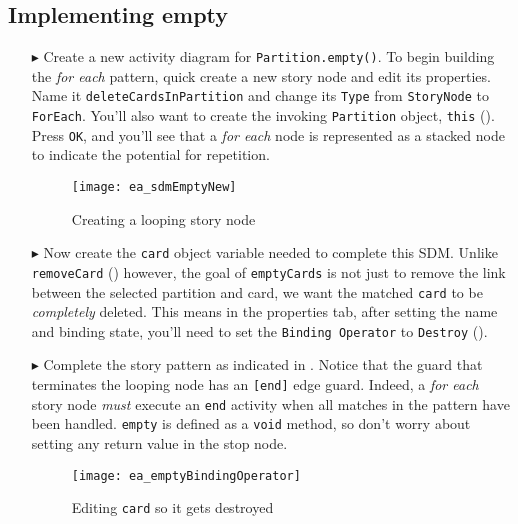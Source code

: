 \newpage
\hypertarget{emptyPartition vis}{}
\subsection{Implementing empty}
\genHeader

\begin{itemize}

\item[$\blacktriangleright$] Create a new activity diagram for \texttt{Partition.empty()}. To begin building the \emph{for each} pattern, quick create a new
story node and edit its properties. Name it \texttt{deleteCardsInPartition} and change its \texttt{Type} from \texttt{StoryNode} to \texttt{ForEach}. You'll
also want to create the invoking \texttt{Partition} object, \texttt{this} (). Press \texttt{OK}, and you'll see that a \emph{for each}
node is represented as a stacked node to indicate the potential for repetition.

\begin{figure}[htbp]
\begin{center}
  \texttt{[image: ea\_sdmEmptyNew]}
  \caption{Creating a looping story node}  
  \label{ea:sdm_foreach}
\end{center}
\end{figure}

\item[$\blacktriangleright$] Now create the \texttt{card} object variable needed to complete this SDM. Unlike \texttt{removeCard}
() however, the goal of \texttt{emptyCards} is not just to remove the link between the selected partition and card, we
want the matched \texttt{card} to be \emph{completely} deleted. This means in the properties tab, after setting the name and binding state, you'll need to set
the \texttt{Binding Operator} to \texttt{Destroy} ().

\item[$\blacktriangleright$] Complete the story pattern as indicated in . Notice that the guard that terminates the looping node has an
\texttt{[end]} edge guard. Indeed, a \emph{for each} story node \emph{must} execute an \texttt{end} activity when all matches in the pattern have been
handled. \texttt{empty} is defined as a \texttt{void} method, so don't worry about setting any return value in the stop node.

\begin{figure}[htbp]
\begin{center}
  \texttt{[image: ea\_emptyBindingOperator]}
  \caption{Editing \texttt{card} so it gets destroyed}  
  \label{ea:sdm_bindingOperator}
\end{center}
\end{figure}


\end{itemize}
